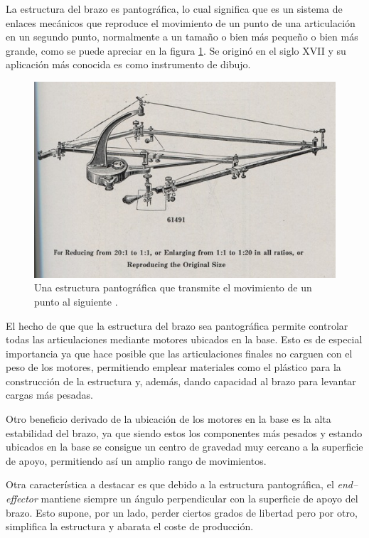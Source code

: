 La estructura del brazo es pantográfica, lo cual significa que es un sistema de enlaces mecánicos que reproduce el movimiento de un punto de una articulación en un segundo punto, normalmente a un tamaño o bien más pequeño o bien más grande, como se puede apreciar en la figura \ref{fig:estrucutra_pantografica}. Se originó en el siglo XVII y su aplicación más conocida es como instrumento de dibujo.

\begin{figure}[H]
    \centering
    \includegraphics[width=.7\linewidth]{pictures/link-to-elliott-p149-suspended-pantograph-sf0.jpg}
    \caption{Una estructura pantográfica que transmite el movimiento de un punto al siguiente \cite{circuitsrootPantographContext}.}
    \label{fig:estrucutra_pantografica}
\end{figure}

El hecho de que que la estructura del brazo sea pantográfica permite controlar todas las articulaciones mediante motores ubicados en la base. Esto es de especial importancia ya que hace posible que las articulaciones finales no carguen con el peso de los motores, permitiendo emplear materiales como el plástico para la construcción de la estructura y, además, dando capacidad al brazo para levantar cargas más pesadas.

Otro beneficio derivado de la ubicación de los motores en la base es la alta estabilidad del brazo, ya que siendo estos los componentes más pesados y estando ubicados en la base se consigue un centro de gravedad muy cercano a la superficie de apoyo, permitiendo así un amplio rango de movimientos.

Otra característica a destacar es que debido a la estructura pantográfica, el \textit{end--effector} mantiene siempre un ángulo perpendicular con la superficie de apoyo del brazo. Esto supone, por un lado, perder ciertos grados de libertad pero por otro, simplifica la estructura y abarata el coste de producción.